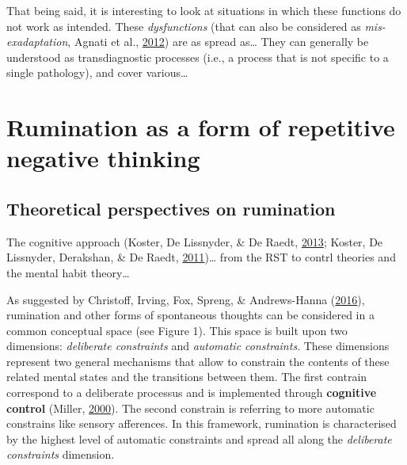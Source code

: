 \documentclass[a4paper,12pt,twoside,openright,oldfontcommands]{memoir}
\begin{document}
That being said, it is interesting to look at situations in which these
functions do not work as intended. These \emph{dysfunctions} (that can
also be considered as \emph{mis-exadaptation}, Agnati et al.,
\protect\hyperlink{ref-agnati_possible_2012}{2012}) are as spread
as\ldots{} They can generally be understood as transdiagnostic processes
(i.e., a process that is not specific to a single pathology), and cover
various\ldots{}

\section{Rumination as a form of repetitive negative
thinking}\label{rumination-as-a-form-of-repetitive-negative-thinking}

\subsection{Theoretical perspectives on
rumination}\label{theoretical-perspectives-on-rumination}

The cognitive approach (Koster, De Lissnyder, \& De Raedt,
\protect\hyperlink{ref-Koster2013}{2013}; Koster, De Lissnyder,
Derakshan, \& De Raedt,
\protect\hyperlink{ref-Koster2011}{2011})\ldots{} from the RST to contrl
theories and the mental habit theory\ldots{}

As suggested by Christoff, Irving, Fox, Spreng, \& Andrews-Hanna
(\protect\hyperlink{ref-christoff_mind-wandering_2016}{2016}),
rumination and other forms of spontaneous thoughts can be considered in
a common conceptual space (see Figure 1). This space is built upon two
dimensions: \emph{deliberate constraints} and \emph{automatic
constraints}. These dimensions represent two general mechanisms that
allow to constrain the contents of these related mental states and the
transitions between them. The first contrain correspond to a deliberate
processus and is implemented through \textbf{cognitive control} (Miller,
\protect\hyperlink{ref-miller_prefrontal_2000}{2000}). The second
constrain is referring to more automatic constrains like sensory
afferences. In this framework, rumination is characterised by the
highest level of automatic constraints and spread all along the
\emph{deliberate constraints} dimension.
\end{document}
